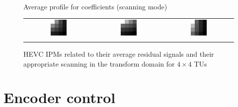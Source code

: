 \documentclass[11pt,a4paper,openright,twoside]{book}
\numberwithin{equation}{section} %
\numberwithin{figure}{section} %
\numberwithin{table}{section} %
\begin{document}
\begin{figure}[tb]
\begin{minipage}{0.48\textwidth}
		\\
		\small
		Average profile for coefficients (scanning mode)
		\begin{tabular}[H]{ccc}
			\includegraphics[width=0.25\textwidth]{figures/coeffs-scan-diag.png}
			&
			\includegraphics[width=0.25\textwidth]{figures/coeffs-scan-horz.png}
			&
			\includegraphics[width=0.25\textwidth]{figures/coeffs-scan-vert.png}
			\\
			\color{red}{diagonal} & \color{greenish}{horizontal} & \color{blue}{vertical} \\
		\end{tabular}
	\end{minipage}
	\caption[\acs{HEVC} intra prediction modes and scannings for $4\times4$\acsp{TU}]
	{\acs{HEVC} \aclp{IPM} related to their average residual signals and their
	appropriate scanning in the transform domain for $4\times4$ \acsp{TU}}
	\label{fig:mdcs}
\end{figure}

\section{Encoder control}
\label{sec:encoder_control}
\end{document}
